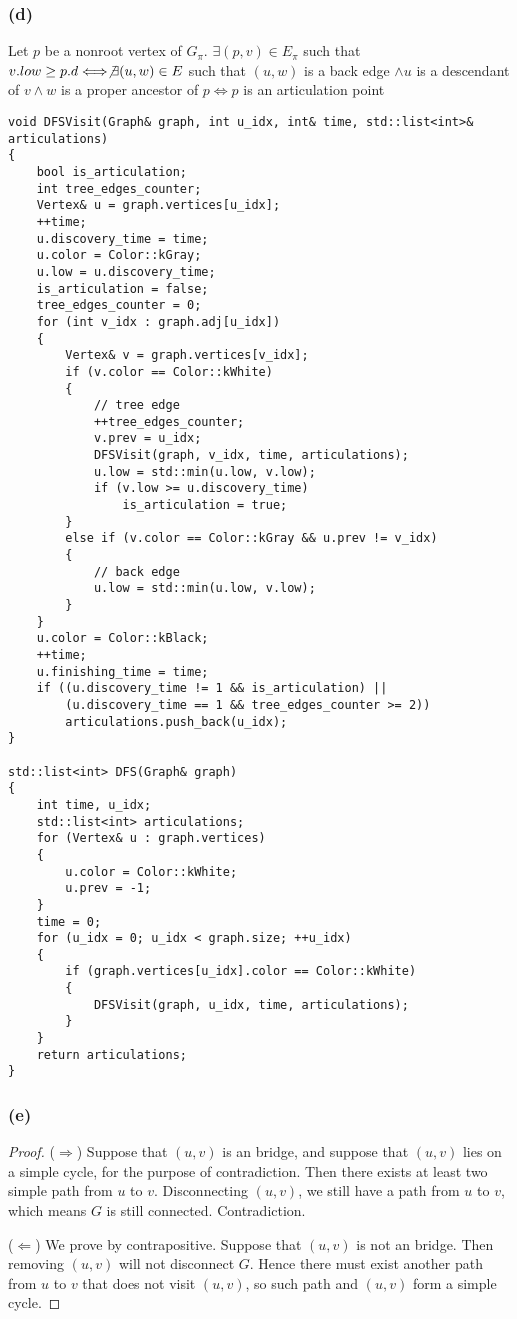 \subsubsection*{(d)}

Let $p$ be a nonroot vertex of $G_\pi$.
$\exists (p,v) \in E_\pi$ such that $v.low \geq p.d \Longleftrightarrow
\not\exists (u,w) \in E$ such that $(u,w)$ is a back edge
$\wedge u$ is a descendant of $v \wedge w$ is a proper ancestor of $p
\Longleftrightarrow p$ is an articulation point

\begin{verbatim}
void DFSVisit(Graph& graph, int u_idx, int& time, std::list<int>& articulations)
{
    bool is_articulation;
    int tree_edges_counter;
    Vertex& u = graph.vertices[u_idx];
    ++time;
    u.discovery_time = time;
    u.color = Color::kGray;
    u.low = u.discovery_time;
    is_articulation = false;
    tree_edges_counter = 0;
    for (int v_idx : graph.adj[u_idx])
    {
        Vertex& v = graph.vertices[v_idx];
        if (v.color == Color::kWhite)
        {
            // tree edge
            ++tree_edges_counter;
            v.prev = u_idx;
            DFSVisit(graph, v_idx, time, articulations);
            u.low = std::min(u.low, v.low);
            if (v.low >= u.discovery_time)
                is_articulation = true;
        }
        else if (v.color == Color::kGray && u.prev != v_idx)
        {
            // back edge
            u.low = std::min(u.low, v.low);
        }
    }
    u.color = Color::kBlack;
    ++time;
    u.finishing_time = time;
    if ((u.discovery_time != 1 && is_articulation) || 
        (u.discovery_time == 1 && tree_edges_counter >= 2))
        articulations.push_back(u_idx);
}

std::list<int> DFS(Graph& graph)
{
    int time, u_idx;
    std::list<int> articulations;
    for (Vertex& u : graph.vertices)
    {
        u.color = Color::kWhite;
        u.prev = -1;
    }
    time = 0;
    for (u_idx = 0; u_idx < graph.size; ++u_idx)
    {
        if (graph.vertices[u_idx].color == Color::kWhite)
        {
            DFSVisit(graph, u_idx, time, articulations);
        }
    }
    return articulations;
}
\end{verbatim}

\subsubsection*{(e)}

\begin{proof}
    ($\Longrightarrow$)
    Suppose that $(u,v)$ is an bridge,
    and suppose that $(u,v)$ lies on a simple cycle,
    for the purpose of contradiction.
    Then there exists at least two simple path from $u$ to $v$.
    Disconnecting $(u,v)$,
    we still have a path from $u$ to $v$,
    which means $G$ is still connected.
    Contradiction.

    ($\Longleftarrow$)
    We prove by contrapositive.
    Suppose that $(u,v)$ is not an bridge.
    Then removing $(u,v)$ will not disconnect $G$.
    Hence there must exist another path from $u$ to $v$
    that does not visit $(u,v)$,
    so such path and $(u,v)$ form a simple cycle.
\end{proof}

